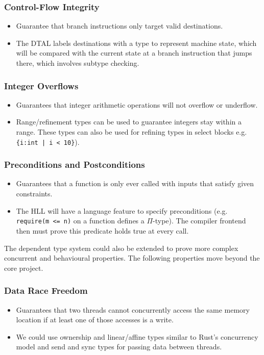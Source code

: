 \documentclass[a4paper, 12pt]{article}
\begin{document}
\subsubsection*{Control-Flow Integrity}
\begin{itemize}
  \item Guarantee that branch instructions only target valid destinations.
  \item The DTAL labels destinations with a type to represent machine state, which will be compared with the current state at a branch instruction that jumps there, which involves subtype checking.
\end{itemize}

\subsubsection*{Integer Overflows}
\begin{itemize}
  \item Guarantees that integer arithmetic operations will not overflow or underflow.
  \item Range/refinement types can be used to guarantee integers stay within a range. These types can also be used for refining types in select blocks e.g. \texttt{\{i:int | i < 10\}}).
\end{itemize}

\subsubsection*{Preconditions and Postconditions}
\begin{itemize}
  \item Guarantees that a function is only ever called with inputs that satisfy given constraints.
  \item The HLL will have a language feature to specify preconditions (e.g. \texttt{require(m <= n)} on a function defines a $\Pi$-type). The compiler frontend then must prove this predicate holds true at every call.
\end{itemize}

The dependent type system could also be extended to prove more complex concurrent and behavioural properties. The following properties move beyond the core project.

\subsubsection*{Data Race Freedom}
\begin{itemize}
  \item Guarantees that two threads cannot concurrently access the same memory location if at least one of those accesses is a write.
  \item We could use ownership and linear/affine types similar to Rust's concurrency model and send and sync types for passing data between threads.
\end{itemize}
\end{document}
